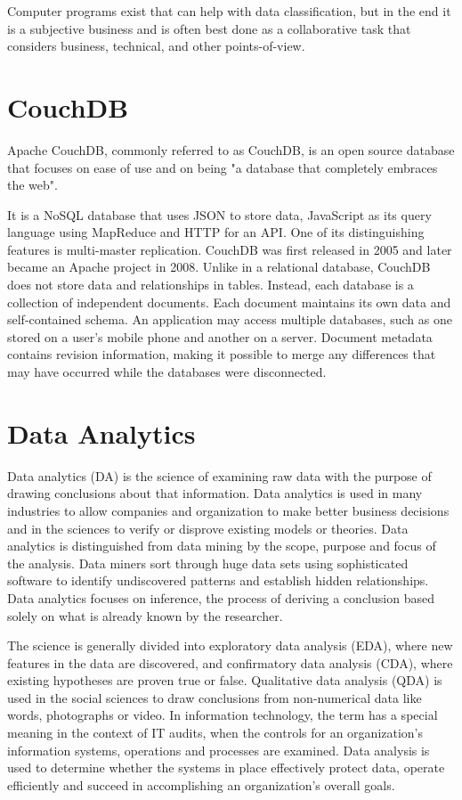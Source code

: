 \documentclass[11pt]{article} %
\begin{document}
Computer programs exist that can help with data classification, but in the end it is a subjective business and is often best done as a collaborative task that considers business, technical, and other points-of-view.
\newpage
\section{CouchDB}
Apache CouchDB, commonly referred to as CouchDB, is an open source database that focuses on ease of use and on being "a database that completely embraces the web". 

It is a NoSQL database that uses JSON to store data, JavaScript as its query language using MapReduce and HTTP for an API. One of its distinguishing features is multi-master replication. CouchDB was first released in 2005 and later became an Apache project in 2008.
Unlike in a relational database, CouchDB does not store data and relationships in tables. Instead, each database is a collection of independent documents. Each document maintains its own data and self-contained schema. An application may access multiple databases, such as one stored on a user's mobile phone and another on a server. Document metadata contains revision information, making it possible to merge any differences that may have occurred while the databases were disconnected.

\section{Data Analytics}
Data analytics (DA) is the science of examining raw data with the purpose of drawing conclusions about that information. Data analytics is used in many industries to allow companies and organization to make better business decisions and in the sciences to verify or disprove existing models or theories. Data analytics is distinguished from data mining by the scope, purpose and focus of the analysis. Data miners sort through huge data sets using sophisticated software to identify undiscovered patterns and establish hidden relationships. Data analytics focuses on inference, the process of deriving a conclusion based solely on what is already known by the researcher.

The science is generally divided into exploratory data analysis (EDA), where new features in the data are discovered, and confirmatory data analysis (CDA), where existing hypotheses are proven true or false. Qualitative data analysis (QDA) is used in the social sciences to draw conclusions from non-numerical data like words, photographs or video. In information technology, the term has a special meaning in the context of IT audits, when the controls for an organization's information systems, operations and processes are examined. Data analysis is used to determine whether the systems in place effectively protect data, operate efficiently and succeed in accomplishing an organization's overall goals.
\end{document}
